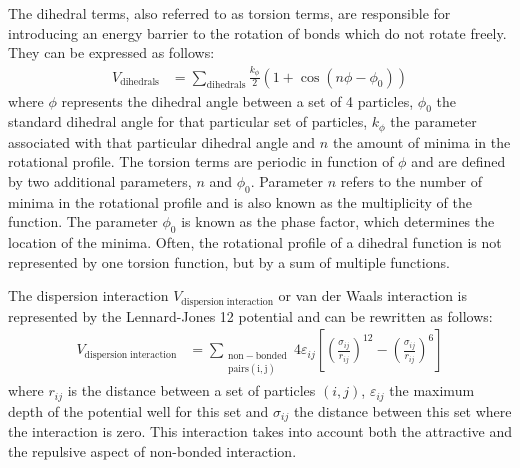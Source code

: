 \documentclass[conference]{IEEEtran}
\begin{document}
The dihedral terms, also referred to as torsion terms, are responsible for introducing an energy barrier to the 
rotation of bonds which do not rotate freely. They can be expressed as follows:
\begin{equation}
    \begin{aligned}
    V_{\mathrm{dihedrals}} &= \sum_{\mathrm{dihedrals}} \frac{k_{\phi}}{2}(1+\cos(n\phi-\phi_0))
    \end{aligned}
\end{equation}
where $\phi$ represents the dihedral angle between a set of 4 particles, $\phi_0$ the standard dihedral angle for 
that particular set of particles, $k_{\phi}$ the parameter associated with that particular dihedral angle and $n$ 
the amount of minima in the rotational profile. The torsion terms are periodic in function of $\phi$ and are 
defined by two additional parameters, $n$ and $\phi_0$. Parameter $n$ refers to the number of minima in the 
rotational profile and is also known as the multiplicity of the function. The parameter $\phi_0$ is known as 
the phase factor, which determines the location of the minima. Often, the rotational profile of a dihedral 
function is not represented by one torsion function, but by a sum of multiple functions. 

The dispersion interaction $V_{\mathrm{dispersion \; interaction}}$ or van der Waals interaction is represented by 
the Lennard-Jones 12 potential and can be rewritten as follows:
\begin{equation}
    \begin{aligned}
    V_{\mathrm{dispersion \; interaction}} &= \sum_{\mathrm{\substack{\mathrm{non-bonded} \\ \mathrm{pairs(i,j)}}}} 4\varepsilon_{ij}\left[
    {\left(\frac{\sigma_{ij}}{r_{ij}}\right)}^{12} - {\left(\frac{\sigma_{ij}}{r_{ij}}\right)}^6
    \right]
    \end{aligned}
\end{equation}
where $r_{ij}$ is the distance between a set of particles $(i,j)$, $\varepsilon_{ij}$ the maximum depth of the 
potential well for this set and $\sigma_{ij}$ the distance between this set where the interaction is zero. This 
interaction takes into account both the attractive and the repulsive aspect of non-bonded interaction. 
\end{document}
